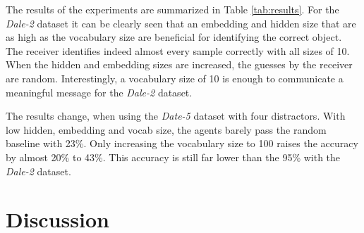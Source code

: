 \documentclass[11pt]{article}
\begin{document}
The results of the experiments are summarized in Table \ref{tab:results}.
For the \emph{Dale-2} dataset it can be clearly seen that an embedding and hidden size that are as high as the vocabulary size are beneficial for identifying the correct object.
The receiver identifies indeed almost every sample correctly with all sizes of 10.
When the hidden and embedding sizes are increased, the guesses by the receiver are random.
Interestingly, a vocabulary size of 10 is enough to communicate a meaningful message for the \emph{Dale-2} dataset.


The results change, when using the \emph{Date-5} dataset with four distractors.
With low hidden, embedding and vocab size, the agents barely pass the random baseline with 23\%.
Only increasing the vocabulary size to 100 raises the accuracy by almost 20\% to 43\%.
This accuracy is still far lower than the 95\% with the \emph{Dale-2} dataset.




\section{Discussion}
\end{document}
